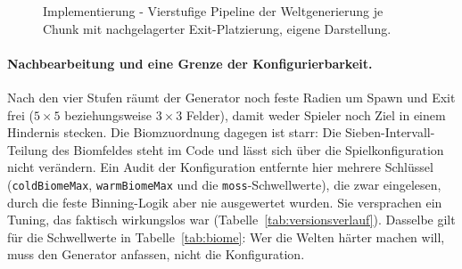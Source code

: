 \documentclass[11pt,a4paper]{article}
\begin{document}
\begin{figure}[h]
\centering
{}
\caption[Pipeline der Weltgenerierung je Chunk]{Implementierung - Vierstufige
Pipeline der Weltgenerierung je Chunk mit nachgelagerter Exit-Platzierung,
eigene Darstellung.}
\label{fig:pcgpipeline}
\end{figure}

\paragraph{Nachbearbeitung und eine Grenze der Konfigurierbarkeit.} Nach den
vier Stufen räumt der Generator noch feste Radien um Spawn und Exit frei
($5\times5$ beziehungsweise $3\times3$ Felder), damit weder Spieler noch Ziel in einem
Hindernis stecken. Die Biomzuordnung dagegen ist starr: Die
Sieben-Intervall-Teilung des Biomfeldes steht im Code und lässt sich über
die Spielkonfiguration nicht verändern. Ein Audit der Konfiguration
entfernte hier mehrere Schlüssel (\texttt{coldBiomeMax}, \texttt{warmBiomeMax}
und die \texttt{moss}-Schwellwerte), die zwar eingelesen, durch die feste
Binning-Logik aber nie ausgewertet wurden. Sie versprachen ein Tuning, das
faktisch wirkungslos war (Tabelle~\ref{tab:versionsverlauf}). Dasselbe gilt für die
Schwellwerte in Tabelle~\ref{tab:biome}: Wer die Welten härter machen will,
muss den Generator anfassen, nicht die Konfiguration.
\end{document}
